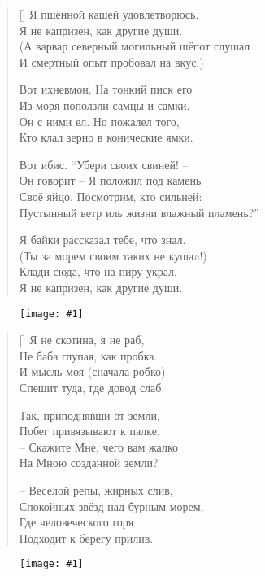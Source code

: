 \documentclass[12pt,a5paper,twoside]{article}
\newcommand{\pict}[1]{\thispagestyle{empty}\begin{figure}[H]\begin{center}\texttt{[image: \#1]}\end{center}\end{figure}\newpage}
\begin{document}
\settowidth{\versewidth}{Я пшённой кашей удовлетворюсь.}
\begin{verse}[\versewidth]
Я пшённой кашей удовлетворюсь.\\
Я не капризен, как другие души.\\
(А варвар северный могильный шёпот слушал\\
И смертный опыт пробовал на вкус.)

Вот ихневмон. На тонкий писк его\\
Из моря поползли самцы и самки.\\
Он с ними ел. Но пожалел того,\\
Кто клал зерно в конические ямки.

Вот ибис. “Убери своих свиней! –\\
Он говорит – Я положил под камень\\
Своё яйцо. Посмотрим, кто сильней:\\
Пустынный ветр иль жизни влажный пламень?”

Я байки рассказал тебе, что знал.\\
(Ты за морем своим таких не кушал!)\\
Клади сюда, что на пиру украл.\\
Я не капризен, как другие души.
\end{verse}
\newpage

\pict{picts/Ya_ne_skotina} 


\settowidth{\versewidth}{Я не скотина, я не раб,}
\begin{verse}[\versewidth]
Я не скотина, я не раб,\\
Не баба глупая, как пробка.\\
И мысль моя (сначала робко)\\
Спешит туда, где довод слаб.

Так, приподнявши от земли,\\
Побег привязывают к палке.\\
– Скажите Мне, чего вам жалко\\
На Мною созданной земли?

– Веселой репы, жирных слив,\\
Спокойных звёзд над бурным морем,\\
Где человеческого горя\\
Подходит к берегу прилив.
\end{verse}
\newpage

\pict{picts/Smeyalsa_Bog} 
\end{document}
